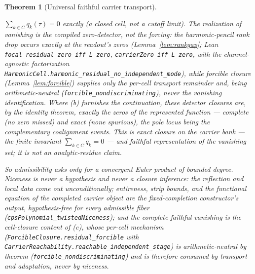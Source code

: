 \documentclass[11pt]{article}
\newtheorem{theorem}{Theorem}
\theoremstyle{definition}
\begin{document}
\begin{theorem}[Universal faithful carrier transport]
\begin{itemize}
$\sum_{k\in C}q_k(\tau)=0$ \emph{exactly} (a closed cell, not a cutoff limit).  The realization of vanishing
is the compiled \emph{zero-detector}, not the forcing: the harmonic-pencil rank drop occurs exactly at the
readout's zeros (Lemma~\ref{lem:rankgap}; Lean \texttt{focal\_residual\_zero\_iff\_L\_zero},
\texttt{carrierZero\_iff\_L\_zero}, with the channel-agnostic factorization
\texttt{HarmonicCell.harmonic\_residual\_no\_independent\_mode}), while forcible closure
(Lemma~\ref{lem:forcible}) supplies only the per-cell transport remainder and, being arithmetic-neutral
(\texttt{forcible\_nondiscriminating}), never the vanishing identification.  Where \emph{(b)} furnishes the
continuation, these detector closures are, by the identity
theorem, exactly the zeros of the represented function --- \emph{complete} (no zero missed) and \emph{exact} (none
spurious), the pole locus being the complementary coalignment events. This is exact closure on the carrier bank --- the finite invariant
$\sum_{k\in C}q_k=0$ --- and faithful representation of the vanishing \emph{set}; it is not an analytic-residue
claim.
\end{itemize}
So admissibility asks only for a convergent Euler product of bounded degree. Niceness is never a
hypothesis and never a closure inference: the reflection and local data come out
unconditionally; entireness, strip bounds, and the functional equation of the completed carrier
object are the fixed-completion constructor's output, hypothesis-free for every admissible fiber
(\texttt{cpsPolynomial\_twistedNiceness}); and the complete faithful vanishing is the
cell-closure content of \textup{(c)}, whose per-cell mechanism
(\texttt{ForcibleClosure.residual\_forcible} with
\texttt{CarrierReachability.reachable\_independent\_stage}) is arithmetic-neutral by theorem
(\texttt{forcible\_nondiscriminating}) and is therefore consumed by transport and adaptation,
never by niceness.
\end{theorem}
\end{document}
